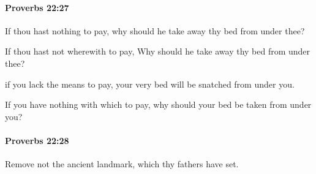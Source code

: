 		\paragraph{Proverbs 22:27} %
			\label{PROVERBS-22-27}

			If thou hast nothing to pay, why should he take away thy bed from under thee?

			\begin{versebox}
					\item[BHS] 
					\item[ASV] If thou hast not wherewith to pay, Why should he take away thy bed from under thee?
					\item[NIV] if you lack the means to pay, your very bed will be snatched from under you.
					\item[NRSV] If you have nothing with which to pay, why should your bed be taken from under you?
			\end{versebox}

		\paragraph{Proverbs 22:28} %
			\label{PROVERBS-22-28}

			Remove not the ancient landmark, which thy fathers have set.

